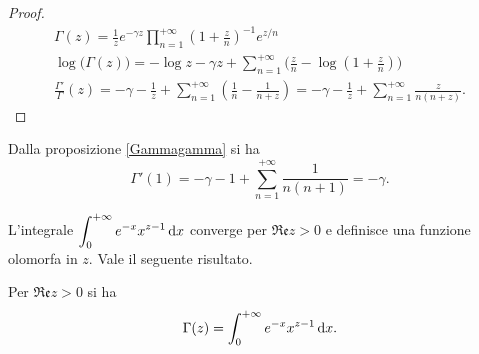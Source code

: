 \begin{proof}
  \begin{gather*}
    \Gamma(z)=\frac{1}{z}e^{-\gamma z}\prod_{n=1}^{+\infty}\left(1+\frac{z}{n}\right)^{-1}e^{z/n} \\
    \log\big(\Gamma(z)\big)=-\log{z}-\gamma z+\sum_{n=1}^{+\infty} \Bigg(\frac{z}{n}-\log\left(1+\frac{z}{n}\right)\Bigg) \\
    \frac{\Gamma'}{\Gamma}(z)=-\gamma-\frac{1}{z}+\sum_{n=1}^{+\infty} \left(\frac{1}{n}-\frac{1}{n+z}\right)=-\gamma-\frac{1}{z}+\sum_{n=1}^{+\infty} \frac{z}{n(n+z)}.
  \end{gather*}
\end{proof}

\begin{oss}
  Dalla proposizione \ref{Gammagamma} si ha
  $$\Gamma'(1)=-\gamma-1+\sum_{n=1}^{+\infty} \frac{1}{n(n+1)}=-\gamma.$$
\end{oss}

L'integrale $\displaystyle \int_0^{+\infty} e^{-x}x^{z-1}\mathop{}\!\mathrm{d} x$ converge per $\mathfrak{Re}z>0$ e definisce una funzione olomorfa in $z$. Vale il seguente risultato.

\begin{thm}
  Per $\mathfrak{Re}z>0$ si ha
  \begin{equation}
    \Gamma(z)=\int_0^{+\infty} e^{-x}x^{z-1}\mathop{}\!\mathrm{d} x.
  \end{equation}
\end{thm}

